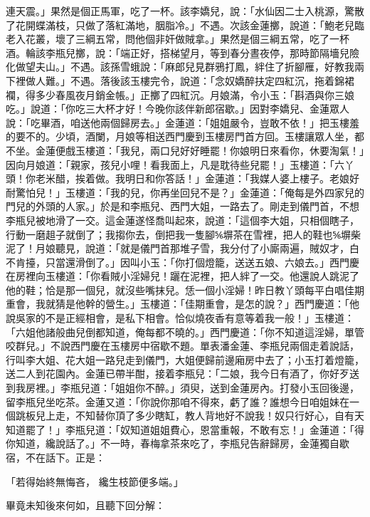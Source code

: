 連天震。」果然是個正馬軍，吃了一杯。該李嬌兒，說：「水仙因二士入桃源，驚散了花開蝶滿枝，只做了落紅滿地，胭脂冷。」不遇。次該金蓮擲，說道：「鮑老兒臨老入花叢，壞了三綱五常，問他個非奸做賊拿。」果然是個三綱五常，吃了一杯酒。輪該李瓶兒擲，說：「端正好，搭梯望月，等到春分晝夜停，那時節隔墻兒險化做望夫山。」不遇。該孫雪蛾說：「麻郎兒見群鴉打鳳，絆住了折腳雁，好教我兩下裡做人難。」不遇。落後該玉樓完令，說道：「念奴嬌醉扶定四紅沉，拖着錦裙襴，得多少春風夜月銷金帳。」正擲了四紅沉。月娘滿，令小玉：「斟酒與你三娘吃。」說道：「你吃三大杯才好！今晚你該伴新郎宿歇。」因對李嬌兒、金蓮眾人說：「吃畢酒，咱送他兩個歸房去。」金蓮道：「姐姐嚴令，豈敢不依！」把玉樓羞的要不的。少頃，酒闌，月娘等相送西門慶到玉樓房門首方回。玉樓讓眾人坐，都不坐。金蓮便戲玉樓道：「我兒，兩口兒好好睡罷！你娘明日來看你，休要淘氣！」因向月娘道：「親家，孩兒小哩！看我面上，凡是耽待些兒罷！」玉樓道：「六丫頭！你老米醋，挨着做。我明日和你答話！」金蓮道：「我媒人婆上樓子。老娘好耐驚怕兒！」玉樓道：「我的兒，你再坐回兒不是？」金蓮道：「俺每是外四家兒的門兒的外頭的人家。」於是和李瓶兒、西門大姐，一路去了。剛走到儀門首，不想李瓶兒被地滑了一交。這金蓮遂怪喬叫起來，說道：「這個李大姐，只相個瞎子，行動一磨趄子就倒了；我搊你去，倒把我一隻腳⅚塀茶在雪裡，把人的鞋也⅚塀柴泥了！月娘聽見，說道：「就是儀門首那堆子雪，我分付了小廝兩遍，賊奴才，白不肯擡，只當還滑倒了。」因叫小玉：「你打個燈籠，送送五娘、六娘去。」西門慶在房裡向玉樓道：「你看賊小淫婦兒！躧在泥裡，把人絆了一交。他還說人跳泥了他的鞋；恰是那一個兒，就沒些嘴抹兒。恁一個小淫婦！昨日教丫頭每平白唱佳期重會，我就猜是他幹的營生。」玉樓道：「佳期重會，是怎的說？」西門慶道：「他說吳家的不是正經相會，是私下相會。恰似燒夜香有意等着我一般！」玉樓道：「六姐他諸般曲兒倒都知道，俺每都不曉的。」西門慶道：「你不知道這淫婦，單管咬群兒。」不說西門慶在玉樓房中宿歇不題。單表潘金蓮、李瓶兒兩個走着說話，行叫李大姐、花大姐一路兒走到儀門，大姐便歸前邊廂房中去了；小玉打着燈籠，送二人到花園內。金蓮已帶半酣，接着李瓶兒：「二娘，我今日有酒了，你好歹送到我房裡。」李瓶兒道：「姐姐你不醉。」須臾，送到金蓮房內。打發小玉回後邊，留李瓶兒坐吃茶。金蓮又道：「你說你那咱不得來，虧了誰？誰想今日咱姐妹在一個跳板兒上走，不知替你頂了多少瞎缸，教人背地好不說我！奴只行好心，自有天知道罷了！」李瓶兒道：「奴知道姐姐費心，恩當重報，不敢有忘！」金蓮道：「得你知道，纔說話了。」不一時，春梅拿茶來吃了，李瓶兒告辭歸房，金蓮獨自歇宿，不在話下。正是：

「若得始終無悔吝， 纔生枝節便多端。」

畢竟未知後來何如，且聽下回分解：

